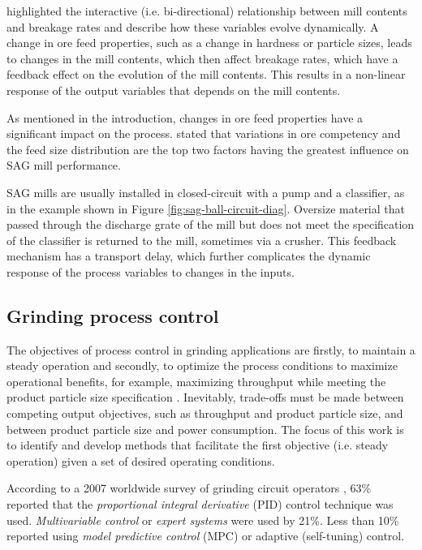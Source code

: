 \cite{powell_applying_2009} highlighted the interactive (i.e. bi-directional) relationship between mill contents and breakage rates and describe how these variables evolve dynamically. A change in ore feed properties, such as a change in hardness or particle sizes, leads to changes in the mill contents, which then affect breakage rates, which have a feedback effect on the evolution of the mill contents. This results in a non-linear response of the output variables that depends on the mill contents.

As mentioned in the introduction, changes in ore feed properties have a significant impact on the process. \cite{morrell_influence_2001} stated that variations in ore competency and the feed size distribution are the top two factors having the greatest influence on \acrshort{SAG} mill performance.

\acrshort{SAG} mills are usually installed in closed-circuit with a pump and a classifier, as in the example shown in Figure \ref{fig:sag-ball-circuit-diag}. Oversize material that passed through the discharge grate of the mill but does not meet the specification of the classifier is returned to the mill, sometimes via a crusher. This feedback mechanism has a transport delay, which further complicates the dynamic response of the process variables to changes in the inputs.

\subsection{Grinding process control}

The objectives of process control in grinding applications are firstly, to maintain a steady operation and secondly, to optimize the process conditions to maximize operational benefits, for example, maximizing throughput while meeting the product particle size specification \citep{wei_grinding_2009}. Inevitably, trade-offs must be made between competing output objectives, such as throughput and product particle size, and between product particle size and power consumption. The focus of this work is to identify and develop methods that facilitate the first objective (i.e. steady operation) given a set of desired operating conditions.

According to a 2007 worldwide survey of grinding circuit operators \citep{wei_grinding_2009}, 63\% reported that the \textit{proportional integral derivative} (\gls{PID}) control technique was used. \textit{Multivariable control} or \textit{expert systems} were used by 21\%. Less than 10\% reported using \textit{model predictive control} (\gls{MPC}) or adaptive (self-tuning) control.

